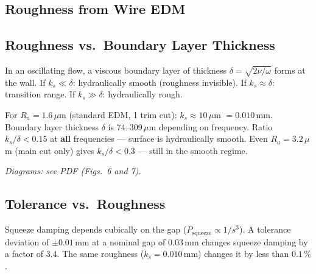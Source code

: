 \documentclass[11pt,a4paper]{article}
\begin{document}
\subsection{Roughness from Wire EDM}

\begin{table}[H]
\centering\small
{}
\end{table}

\subsection{Roughness vs.\ Boundary Layer Thickness}

In an oscillating flow, a viscous boundary layer of thickness $\delta = \sqrt{2\nu/\omega}$ forms at the wall. If $k_s \ll \delta$: hydraulically smooth (roughness invisible). If $k_s \approx \delta$: transition range. If $k_s \gg \delta$: hydraulically rough.

For $R_a = 1{.}6\,\mu$m (standard EDM, 1 trim cut): $k_s \approx 10\,\mu$m $= 0{.}010$\,mm. Boundary layer thickness $\delta$ is 74--309\,$\mu$m depending on frequency. Ratio $k_s/\delta < 0{.}15$ at \textbf{all} frequencies --- surface is hydraulically smooth. Even $R_a = 3{.}2\,\mu$m (main cut only) gives $k_s/\delta < 0{.}3$ --- still in the smooth regime.

\textit{Diagrams: see PDF (Figs.~6 and 7).}

\subsection{Tolerance vs.\ Roughness}

Squeeze damping depends cubically on the gap ($P_\text{squeeze} \propto 1/s^3$). A tolerance deviation of $\pm 0{.}01$\,mm at a nominal gap of $0{.}03$\,mm changes squeeze damping by a factor of 3.4. The same roughness ($k_s = 0{.}010$\,mm) changes it by less than $0{.}1\,\%$.
\end{document}
